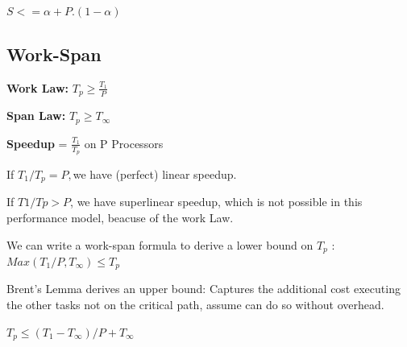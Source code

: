 $S <= \alpha + P.(1  - \alpha)$

\subsection{Work-Span}

\textbf{Work Law:} $T_p \geq \frac{T_1}{P}$ \par
\textbf{Span Law:} $T_p \geq T_\infty$\par

\textbf{Speedup} = $\frac{T_1}{T_p}$ on P Processors \par

If $T_1/T_p = P,$we have (perfect) linear speedup.\par

If $T1/Tp > P$, we have superlinear speedup, which is not possible in this performance model, beacuse of the work Law.\par

We can write a work-span formula to derive a lower bound on $T_p$ : $Max(T_1/P,T_\infty) \leq T_p $ \par

Brent's Lemma derives an upper bound: Captures the additional cost executing the other tasks not on the critical path, assume can do so without overhead.\par

$T_p \leq (T_1 - T_\infty) / P + T_\infty$